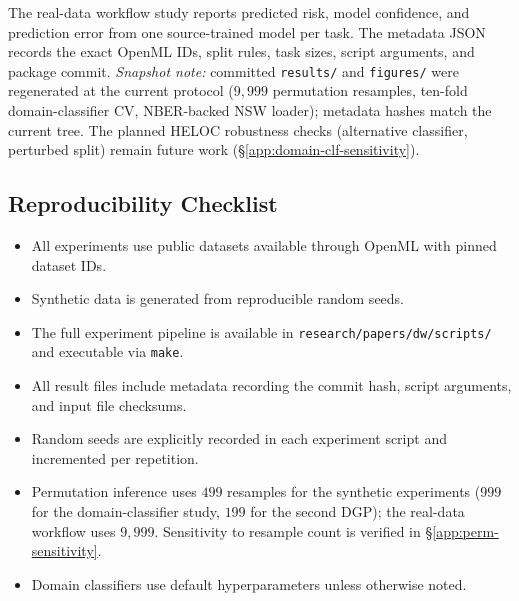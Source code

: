 The real-data workflow study reports predicted risk, model confidence, and prediction error from one source-trained model per task. The metadata JSON records the exact OpenML IDs, split rules, task sizes, script arguments, and package commit. \emph{Snapshot note:} committed \texttt{results/} and \texttt{figures/} were regenerated at the current protocol ($9{,}999$ permutation resamples, ten-fold domain-classifier CV, NBER-backed NSW loader); metadata hashes match the current tree. The planned HELOC robustness checks (alternative classifier, perturbed split) remain future work (\S\ref{app:domain-clf-sensitivity}).

\subsection{Reproducibility Checklist}

\begin{itemize}
    \item All experiments use public datasets available through OpenML with pinned dataset IDs.
    \item Synthetic data is generated from reproducible random seeds.
    \item The full experiment pipeline is available in \texttt{research/papers/dw/scripts/} and executable via \texttt{make}.
    \item All result files include metadata recording the commit hash, script arguments, and input file checksums.
    \item Random seeds are explicitly recorded in each experiment script and incremented per repetition.
    \item Permutation inference uses $499$ resamples for the synthetic experiments ($999$ for the domain-classifier study, $199$ for the second DGP); the real-data workflow uses $9{,}999$. Sensitivity to resample count is verified in \S\ref{app:perm-sensitivity}.
    \item Domain classifiers use default hyperparameters unless otherwise noted.
\end{itemize}

\fussy
